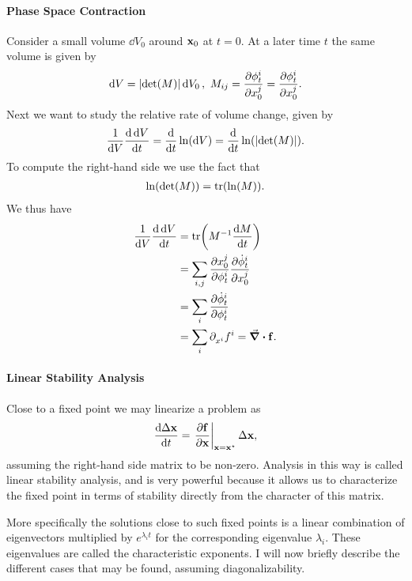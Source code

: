 \paragraph{Phase Space Contraction}
Consider a small volume $\dd{V_{0}}$ around $\vb{x}_{0}$ at $t = 0$. At a later time $t$ the same volume is given by
\begin{align*}
	\dd{V} = \abs{\det(M)}\dd{V_{0}},\ M_{ij} = \pdv{\phi_{t}^{i}}{x_{0}^{j}} = \pdv{\phi_{t}^{i}}{x_{0}^{j}}.
\end{align*}
Next we want to study the relative rate of volume change, given by
\begin{align*}
	\frac{1}{\dd{V}}\dv{\dd{V}}{t} = \dv{t}\ln(\dd{V}) = \dv{t}\ln(\abs{\det(M)}).
\end{align*}
To compute the right-hand side we use the fact that
\begin{align*}
	\ln(\det(M)) = \tr(\ln(M)).
\end{align*}
We thus have
\begin{align*}
	\frac{1}{\dd{V}}\dv{\dd{V}}{t} &= \tr(M^{-1}\dv{M}{t}) \\
	                               &= \sum\limits_{i, j}\pdv{x_{0}^{j}}{\phi_{t}^{i}}\pdv{\dot{\phi}_{t}^{i}}{x_{0}^{j}} \\
	                               &= \sum\limits_{i}\pdv{\dot{\phi}_{t}^{i}}{\phi_{t}^{i}} \\
	                               &= \sum\limits_{i}\partial^{}_{x^{i}}f^{i} = \div{\vb{f}}.
\end{align*}

\paragraph{Linear Stability Analysis}
Close to a fixed point we may linearize a problem as
\begin{align*}
	\dv{\Delta\vb{x}}{t} = \eval{\pdv{\vb{f}}{\vb{x}}}_{\vb{x} = \vb{x}^{\star}}\Delta\vb{x},
\end{align*}
assuming the right-hand side matrix to be non-zero. Analysis in this way is called linear stability analysis, and is very powerful because it allows us to characterize the fixed point in terms of stability directly from the character of this matrix.

More specifically the solutions close to such fixed points is a linear combination of eigenvectors multiplied by $e^{\lambda_{i}t}$ for the corresponding eigenvalue $\lambda_{i}$. These eigenvalues are called the characteristic exponents. I will now briefly describe the different cases that may be found, assuming diagonalizability.

